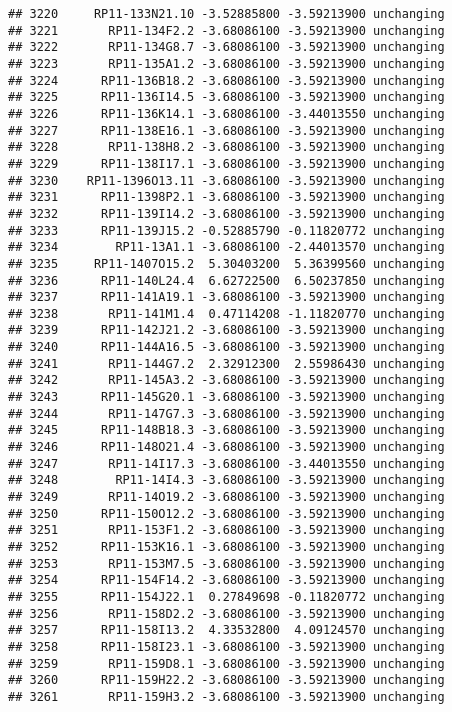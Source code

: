 \documentclass[]{article}
\begin{document}
\begin{verbatim}
## 3220     RP11-133N21.10 -3.52885800 -3.59213900 unchanging
## 3221       RP11-134F2.2 -3.68086100 -3.59213900 unchanging
## 3222       RP11-134G8.7 -3.68086100 -3.59213900 unchanging
## 3223       RP11-135A1.2 -3.68086100 -3.59213900 unchanging
## 3224      RP11-136B18.2 -3.68086100 -3.59213900 unchanging
## 3225      RP11-136I14.5 -3.68086100 -3.59213900 unchanging
## 3226      RP11-136K14.1 -3.68086100 -3.44013550 unchanging
## 3227      RP11-138E16.1 -3.68086100 -3.59213900 unchanging
## 3228       RP11-138H8.2 -3.68086100 -3.59213900 unchanging
## 3229      RP11-138I17.1 -3.68086100 -3.59213900 unchanging
## 3230    RP11-1396O13.11 -3.68086100 -3.59213900 unchanging
## 3231      RP11-1398P2.1 -3.68086100 -3.59213900 unchanging
## 3232      RP11-139I14.2 -3.68086100 -3.59213900 unchanging
## 3233      RP11-139J15.2 -0.52885790 -0.11820772 unchanging
## 3234        RP11-13A1.1 -3.68086100 -2.44013570 unchanging
## 3235     RP11-1407O15.2  5.30403200  5.36399560 unchanging
## 3236      RP11-140L24.4  6.62722500  6.50237850 unchanging
## 3237      RP11-141A19.1 -3.68086100 -3.59213900 unchanging
## 3238       RP11-141M1.4  0.47114208 -1.11820770 unchanging
## 3239      RP11-142J21.2 -3.68086100 -3.59213900 unchanging
## 3240      RP11-144A16.5 -3.68086100 -3.59213900 unchanging
## 3241       RP11-144G7.2  2.32912300  2.55986430 unchanging
## 3242       RP11-145A3.2 -3.68086100 -3.59213900 unchanging
## 3243      RP11-145G20.1 -3.68086100 -3.59213900 unchanging
## 3244       RP11-147G7.3 -3.68086100 -3.59213900 unchanging
## 3245      RP11-148B18.3 -3.68086100 -3.59213900 unchanging
## 3246      RP11-148O21.4 -3.68086100 -3.59213900 unchanging
## 3247       RP11-14I17.3 -3.68086100 -3.44013550 unchanging
## 3248        RP11-14I4.3 -3.68086100 -3.59213900 unchanging
## 3249       RP11-14O19.2 -3.68086100 -3.59213900 unchanging
## 3250      RP11-150O12.2 -3.68086100 -3.59213900 unchanging
## 3251       RP11-153F1.2 -3.68086100 -3.59213900 unchanging
## 3252      RP11-153K16.1 -3.68086100 -3.59213900 unchanging
## 3253       RP11-153M7.5 -3.68086100 -3.59213900 unchanging
## 3254      RP11-154F14.2 -3.68086100 -3.59213900 unchanging
## 3255      RP11-154J22.1  0.27849698 -0.11820772 unchanging
## 3256       RP11-158D2.2 -3.68086100 -3.59213900 unchanging
## 3257      RP11-158I13.2  4.33532800  4.09124570 unchanging
## 3258      RP11-158I23.1 -3.68086100 -3.59213900 unchanging
## 3259       RP11-159D8.1 -3.68086100 -3.59213900 unchanging
## 3260      RP11-159H22.2 -3.68086100 -3.59213900 unchanging
## 3261       RP11-159H3.2 -3.68086100 -3.59213900 unchanging

\end{verbatim}
\end{document}
